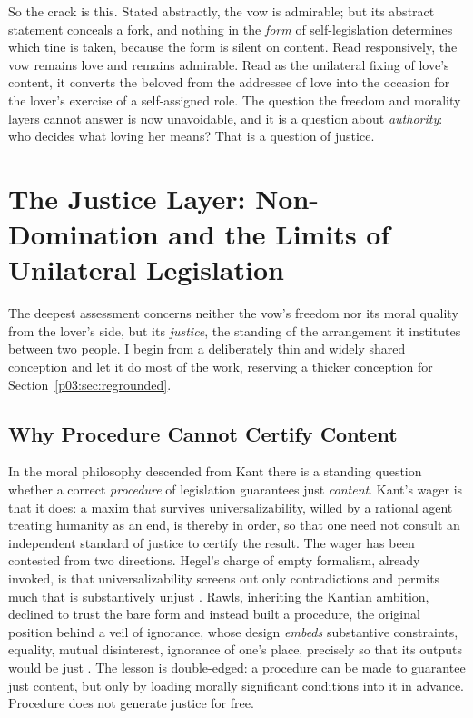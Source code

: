 So the crack is this. Stated abstractly, the vow is admirable; but its abstract statement conceals a fork, and nothing in the \emph{form} of self-legislation determines which tine is taken, because the form is silent on content. Read responsively, the vow remains love and remains admirable. Read as the unilateral fixing of love's content, it converts the beloved from the addressee of love into the occasion for the lover's exercise of a self-assigned role. The question the freedom and morality layers cannot answer is now unavoidable, and it is a question about \emph{authority}: who decides what loving her means? That is a question of justice.

\section{The Justice Layer: Non-Domination and the Limits of Unilateral Legislation}\label{p03:sec:justice}

The deepest assessment concerns neither the vow's freedom nor its moral quality from the lover's side, but its \emph{justice}, the standing of the arrangement it institutes between two people. I begin from a deliberately thin and widely shared conception and let it do most of the work, reserving a thicker conception for Section~\ref{p03:sec:regrounded}.

\subsection{Why Procedure Cannot Certify Content}

In the moral philosophy descended from Kant there is a standing question whether a correct \emph{procedure} of legislation guarantees just \emph{content}. Kant's wager is that it does: a maxim that survives universalizability, willed by a rational agent treating humanity as an end, is thereby in order, so that one need not consult an independent standard of justice to certify the result. The wager has been contested from two directions. Hegel's charge of empty formalism, already invoked, is that universalizability screens out only contradictions and permits much that is substantively unjust \parencite[§135]{hegel1820right}. Rawls, inheriting the Kantian ambition, declined to trust the bare form and instead built a procedure, the original position behind a veil of ignorance, whose design \emph{embeds} substantive constraints, equality, mutual disinterest, ignorance of one's place, precisely so that its outputs would be just \parencite{rawls1971theory}. The lesson is double-edged: a procedure can be made to guarantee just content, but only by loading morally significant conditions into it in advance. Procedure does not generate justice for free.


